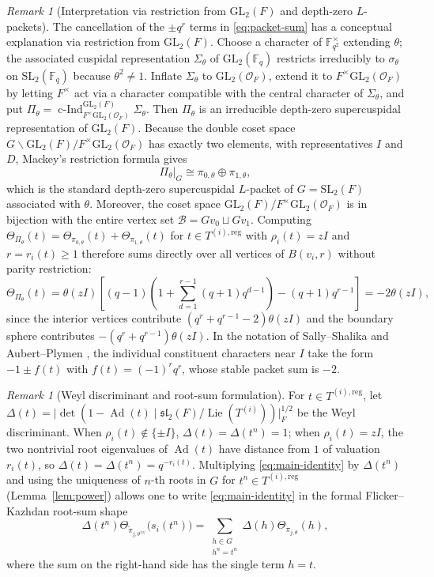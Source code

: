 \documentclass[12pt, letterpaper]{article}
\numberwithin{equation}{section}
\theoremstyle{definition}
\theoremstyle{remark}
\newtheorem{remark}[theorem]{Remark}
\newcommand{\OO}{\mathcal{O}_F}
\newcommand{\kk}{\mathbb{F}_q}
\newcommand{\Gbar}{\mathrm{SL}_2(\kk)}
\newcommand{\G}{\mathrm{SL}_2(F)}
\newcommand{\cInd}{\operatorname{c-Ind}}
\newcommand{\Ad}{\operatorname{Ad}}
\newcommand{\Lie}{\operatorname{Lie}}
\begin{document}
\begin{remark}[Interpretation via restriction from $\mathrm{GL}_2(F)$ and depth-zero $L$-packets]\label{rem:GL2-packet}
The cancellation of the $\pm q^r$ terms in \eqref{eq:packet-sum} has a conceptual explanation via restriction from $\mathrm{GL}_2(F)$. Choose a character of $\mathbb{F}_{q^2}^\times$ extending $\theta$; the associated cuspidal representation $\Sigma_\theta$ of $\mathrm{GL}_2(\kk)$ restricts irreducibly to $\sigma_\theta$ on $\Gbar$ because $\theta^2\ne 1$. Inflate $\Sigma_\theta$ to $\mathrm{GL}_2(\OO)$, extend it to $F^\times\mathrm{GL}_2(\OO)$ by letting $F^\times$ act via a character compatible with the central character of $\Sigma_\theta$, and put $\Pi_\theta=\cInd_{F^\times\mathrm{GL}_2(\OO)}^{\mathrm{GL}_2(F)}\Sigma_\theta$. Then $\Pi_\theta$ is an irreducible depth-zero supercuspidal representation of $\mathrm{GL}_2(F)$. Because the double coset space $G\backslash\mathrm{GL}_2(F)/F^\times\mathrm{GL}_2(\OO)$ has exactly two elements, with representatives $I$ and $D$, Mackey's restriction formula gives
\[
 \Pi_\theta|_G\cong \pi_{0,\theta}\oplus\pi_{1,\theta},
\]
which is the standard depth-zero supercuspidal $L$-packet of $G=\G$ associated with $\theta$. Moreover, the coset space $\mathrm{GL}_2(F)/F^\times\mathrm{GL}_2(\OO)$ is in bijection with the entire vertex set $\mathscr{B}=Gv_0\sqcup Gv_1$. Computing $\Theta_{\Pi_\theta}(t)=\Theta_{\pi_{0,\theta}}(t)+\Theta_{\pi_{1,\theta}}(t)$ for $t\in T^{(i),\mathrm{reg}}$ with $\rho_i(t)=zI$ and $r=r_i(t)\ge 1$ therefore sums directly over all vertices of $B(v_i,r)$ without parity restriction:
\[
 \Theta_{\Pi_\theta}(t)=\theta(zI)\left[(q-1)\left(1+\sum_{d=1}^{r-1}(q+1)q^{d-1}\right)-(q+1)q^{r-1}\right]
 =-2\theta(zI),
\]
since the interior vertices contribute $(q^r+q^{r-1}-2)\theta(zI)$ and the boundary sphere contributes $-(q^r+q^{r-1})\theta(zI)$. In the notation of Sally--Shalika \cite{SS68} and Aubert--Plymen \cite{AP24}, the individual constituent characters near $I$ take the form $-1\pm f(t)$ with $f(t)=(-1)^r q^r$, whose stable packet sum is $-2$.
\end{remark}

\begin{remark}[Weyl discriminant and root-sum formulation]\label{rem:discriminant}
For $t\in T^{(i),\mathrm{reg}}$, let $\Delta(t)=\bigl|\det(1-\Ad(t)\mid\mathfrak{sl}_2(F)/\Lie(T^{(i)}))\bigr|_F^{1/2}$ be the Weyl discriminant. When $\rho_i(t)\notin\{\pm I\}$, $\Delta(t)=\Delta(t^n)=1$; when $\rho_i(t)=zI$, the two nontrivial root eigenvalues of $\Ad(t)$ have distance from $1$ of valuation $r_i(t)$, so $\Delta(t)=\Delta(t^n)=q^{-r_i(t)}$. Multiplying \eqref{eq:main-identity} by $\Delta(t^n)$ and using the uniqueness of $n$-th roots in $G$ for $t^n\in T^{(i),\mathrm{reg}}$ (Lemma~\ref{lem:power}) allows one to write \eqref{eq:main-identity} in the formal Flicker--Kazhdan root-sum shape
\[
 \Delta(t^n)\Theta_{\widetilde{\pi}_{j,\theta^{\langle n\rangle}}}\bigl(s_i(t^n)\bigr)
 =\sum_{\substack{h\in G\\ h^n=t^n}}\Delta(h)\Theta_{\pi_{j,\theta}}(h),
\]
where the sum on the right-hand side has the single term $h=t$.
\end{remark}
\end{document}
